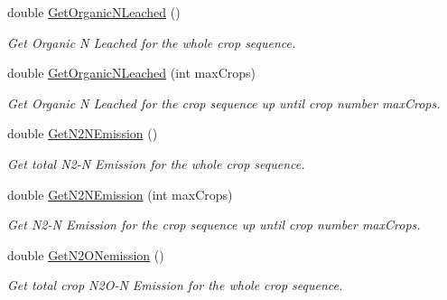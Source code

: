 \begin{DoxyCompactItemize}
\mbox{\label{class_crop_sequence_class_a8e17c89d14a240e2943ea26b4f60c1bd}} 
double \mbox{\hyperlink{class_crop_sequence_class_a8e17c89d14a240e2943ea26b4f60c1bd}{Get\+Organic\+N\+Leached}} ()
\begin{DoxyCompactList}\small\item\em Get Organic N Leached for the whole crop sequence. \end{DoxyCompactList}\item 
\mbox{\label{class_crop_sequence_class_adcc7d7f3211236c6a93ab34d117f1a25}} 
double \mbox{\hyperlink{class_crop_sequence_class_adcc7d7f3211236c6a93ab34d117f1a25}{Get\+Organic\+N\+Leached}} (int max\+Crops)
\begin{DoxyCompactList}\small\item\em Get Organic N Leached for the crop sequence up until crop number max\+Crops. \end{DoxyCompactList}\item 
\mbox{\label{class_crop_sequence_class_adf241517ee886bcd1a918d74bcd4ee11}} 
double \mbox{\hyperlink{class_crop_sequence_class_adf241517ee886bcd1a918d74bcd4ee11}{Get\+N2\+N\+Emission}} ()
\begin{DoxyCompactList}\small\item\em Get total N2-\/N Emission for the whole crop sequence. \end{DoxyCompactList}\item 
\mbox{\label{class_crop_sequence_class_afb3c52e232a44a68f65c7d3a7b67ba70}} 
double \mbox{\hyperlink{class_crop_sequence_class_afb3c52e232a44a68f65c7d3a7b67ba70}{Get\+N2\+N\+Emission}} (int max\+Crops)
\begin{DoxyCompactList}\small\item\em Get N2-\/N Emission for the crop sequence up until crop number max\+Crops. \end{DoxyCompactList}\item 
\mbox{\label{class_crop_sequence_class_aa009ad2cc519073672c1509ecf34f85e}} 
double \mbox{\hyperlink{class_crop_sequence_class_aa009ad2cc519073672c1509ecf34f85e}{Get\+N2\+O\+Nemission}} ()
\begin{DoxyCompactList}\small\item\em Get total crop N2\+O-\/N Emission for the whole crop sequence. \end{DoxyCompactList}\item 

\end{DoxyCompactItemize}
